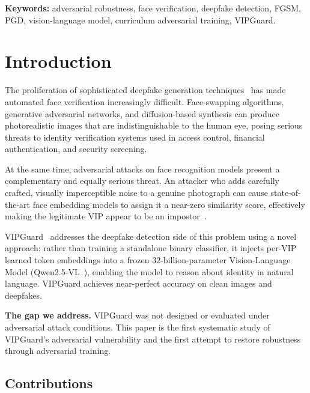\documentclass[12pt,a4paper]{article}
\begin{document}
\vspace{6pt}
\noindent\textbf{Keywords:} adversarial robustness, face verification, deepfake
detection, FGSM, PGD, vision-language model, curriculum adversarial training,
VIPGuard.

\newpage

\section{Introduction}

The proliferation of sophisticated deepfake generation techniques~\cite{rossler2019faceforensics,li2020celeb} has made
automated face verification increasingly difficult.  Face-swapping algorithms,
generative adversarial networks, and diffusion-based synthesis can produce
photorealistic images that are indistinguishable to the human eye, posing serious
threats to identity verification systems used in access control, financial
authentication, and security screening.

At the same time, adversarial attacks on face recognition models present a
complementary and equally serious threat.  An attacker who adds carefully crafted,
visually imperceptible noise to a genuine photograph can cause state-of-the-art
face embedding models to assign it a near-zero similarity score, effectively
making the legitimate VIP appear to be an impostor~\cite{goodfellow2014explaining,madry2018towards}.

VIPGuard~\cite{vipguard2024} addresses the deepfake detection side of this
problem using a novel approach: rather than training a standalone binary
classifier, it injects per-VIP learned token embeddings into a frozen
32-billion-parameter Vision-Language Model (Qwen2.5-VL~\cite{bai2025qwen2vl}),
enabling the model to reason about identity in natural language.  VIPGuard
achieves near-perfect accuracy on clean images and deepfakes.

\textbf{The gap we address.} VIPGuard was not designed or evaluated under
adversarial attack conditions.  This paper is the first systematic study of
VIPGuard's adversarial vulnerability and the first attempt to restore robustness
through adversarial training.

\subsection*{Contributions}
\end{document}
